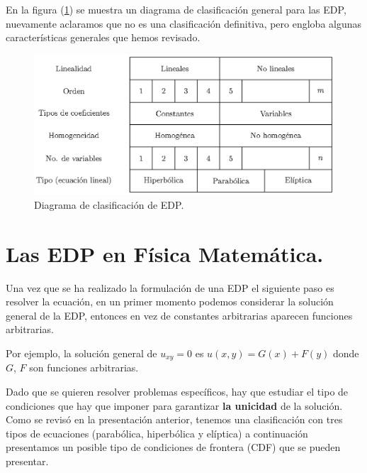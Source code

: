 \documentclass[12pt]{article}
\numberwithin{equation}{section}
\begin{document}
En la figura (\ref{fig:figura_clasificacion_EDP}) se muestra un diagrama de clasificación general para las EDP, nuevamente aclaramos que no es una clasificación definitiva, pero engloba algunas características generales que hemos revisado.
\begin{figure}[H]
    \centering
    \includegraphics[scale=1]{Imagenes/Cuadro_Clasificacion_EDP.eps}
    \caption{Diagrama de clasificación de EDP.}
    \label{fig:figura_clasificacion_EDP}
\end{figure}


\section{Las EDP en Física Matemática.}

Una vez que se ha realizado la formulación de una EDP el siguiente paso es resolver la ecuación, en un primer momento podemos considerar la solución general de la EDP, entonces en vez de constantes arbitrarias aparecen funciones arbitrarias.
\par
Por ejemplo, la solución general de $u_{xy} = 0$ es $u(x, y) = G(x) + F (y)$ donde $G$, $F$ son funciones arbitrarias.
\par
Dado que se quieren resolver problemas específicos, hay que estudiar el tipo de condiciones que hay que imponer para garantizar \textbf{la unicidad} de la solución. Como se revisó en la presentación anterior, tenemos una clasificación con tres tipos de ecuaciones (parabólica, hiperbólica y elíptica) a continuación presentamos un posible tipo de condiciones de frontera (CDF) que se pueden presentar.
\end{document}
